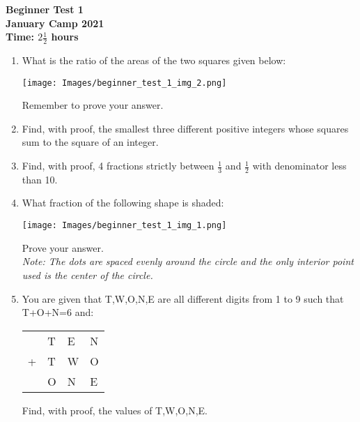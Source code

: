 \usepackage{mathtools,amsfonts}
\usepackage{enumerate}
\usepackage{fullpage}
\usepackage{array}


\thispagestyle{empty}

\begin{center}
  \textbf{\Large Beginner Test 1}
  \\ \vspace{1em}
  \textbf{\large January Camp 2021}
  \\ \vspace{1em}
  \textbf{\large Time: $2\frac{1}{2}$ hours}
\end{center}

\vspace{24pt}

\begin{enumerate}[1.]


\item What is the ratio of the areas of the two squares given below:
	\begin{center}
	\texttt{[image: Images/beginner\_test\_1\_img\_2.png]}	
	\end{center}
Remember to prove your answer.\\


\item Find, with proof, the smallest three different positive integers whose squares sum to the square of an integer. %


\item Find, with proof, 4 fractions strictly between $\frac{1}{3}$ and $\frac{1}{2}$ with denominator less than 10. %


\item What fraction of the following shape is shaded:
	\begin{center}
	\texttt{[image: Images/beginner\_test\_1\_img\_1.png]}	
	\end{center}
Prove your answer.\\
\textit{Note: The dots are spaced evenly around the circle and the only interior point used is the center of the circle.}


\item You are given that T,W,O,N,E are all different digits from 1 to 9 such that T+O+N=6 and:
\begin{center}
\begin{tabular}{m{1cm} m{0.5cm} m{0.5cm} m{0.5cm}}
&T&E&N\\
+&T&W&O\\
\hline
&O&N&E\\
\hline
\end{tabular}
\end{center}
Find, with proof, the values of T,W,O,N,E.



\end{enumerate}

